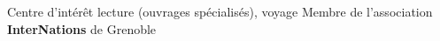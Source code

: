 \begin{rubric}{Centre d’intérêt}
\entry*[Loisirs] lecture (ouvrages spécialisés), voyage
 Membre de l’association \textbf{InterNations} de Grenoble
\end{rubric}

